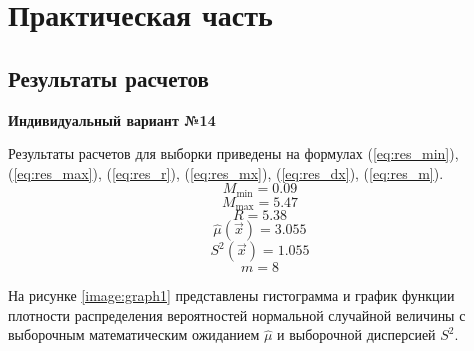 \chapter{Практическая часть}

\section{Результаты расчетов}
\textbf{Индивидуальный вариант №14}

Результаты расчетов для выборки приведены на формулах (\ref{eq:res_min}), (\ref{eq:res_max}), (\ref{eq:res_r}), (\ref{eq:res_mx}), (\ref{eq:res_dx}), (\ref{eq:res_m}).
\begin{equation}
	\label{eq:res_min}
	M_{\min} = 0.09
\end{equation}
\begin{equation}
	\label{eq:res_max}
	M_{\max} = 5.47
\end{equation}
\begin{equation}
	\label{eq:res_r}
	R = 5.38
\end{equation}
\begin{equation}
	\label{eq:res_mx}
	\hat\mu(\vec x) = 3.055
\end{equation}
\begin{equation}
	\label{eq:res_dx}
	S^2(\vec x) = 1.055
\end{equation}
\begin{equation}
	\label{eq:res_m}
	m = 8
\end{equation}

На рисунке \ref{image:graph1} представлены гистограмма и график функции плотности распределения вероятностей нормальной случайной величины с выборочным математическим ожиданием $\hat\mu$ и выборочной дисперсией $S^2$.
\begin{figure}[h]
\end{figure}

